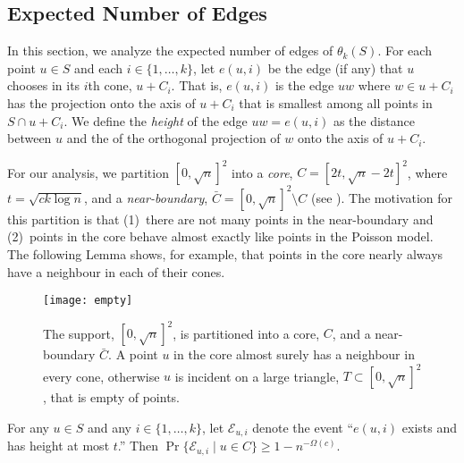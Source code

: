 \documentclass[twoside,leqno,twocolumn]{article}
\begin{document}
\subsection{Expected Number of Edges}

In this section, we analyze the expected number of edges of $\theta_k(S)$.
For each point $u\in S$ and each $i\in\{1,\ldots,k\}$, let $e(u,i)$ be
the edge (if any) that $u$ chooses in its $i$th cone, $u+C_i$.  That is,
$e(u,i)$ is the edge $uw$ where $w\in u+C_i$ has the projection onto
the axis of $u+C_i$ that is smallest among all points in $S\cap u+C_i$.
We define the \emph{height} of the edge $uw=e(u,i)$ as the distance
between $u$ and the of the orthogonal projection of $w$ onto the axis
of $u+C_i$.

For our analysis, we partition $[0,\sqrt{n}]^2$ into a
\emph{core}, $C=[2t,\sqrt{n}-2t]^2$, where $t=\sqrt{ck\log n}$,
and a \emph{near-boundary}, $\bar{C}=[0,\sqrt{n}]^2\setminus C$
(see ).  The motivation for this partition
is that (1)~there are not many points in the near-boundary
and (2)~points in the core behave almost exactly like points in the
Poisson model.  The following Lemma shows, for example, that points in
the core nearly always have a neighbour in each of their cones.

\begin{figure}
  \begin{center}
    \texttt{[image: empty]}
  \end{center}
  \caption{The support, $[0,\sqrt{n}]^2$, is partitioned into a core, $C$,
    and a near-boundary $\bar{C}$.  A point $u$ in the core almost surely
    has a neighbour in every cone, otherwise $u$ is incident on a large
    triangle, $T\subset [0,\sqrt{n}]^2$, that is empty of points.}
\end{figure}

\newcommand{\eui}{\mathcal{E}_{u,i}}
\newcommand{\neui}{\bar{\mathcal{E}}_{u,i}}

\begin{lem}
  For any $u\in S$ and any $i\in\{1,\ldots,k\}$, let $\eui$ denote
  the event ``$e(u,i)$ exists and has height at most $t$.''  Then
  $\Pr\{\eui\mid u\in C\} \ge 1-n^{-\Omega(c)}$.
\end{lem}
\end{document}
